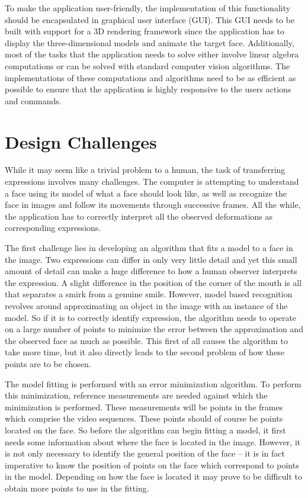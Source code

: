 \documentclass[11pt,a4paper,twoside]{report}
\begin{document}
To make the application user-friendly, the implementation of this functionality should be encapsulated in
graphical user interface (GUI). This GUI needs to be built with support for a 3D
rendering framework since the application has to display the three-dimensional models and animate
the target face. Additionally, most of the tasks that the application needs to
solve either involve linear algebra computations or can be solved with standard
computer vision algorithms. The implementations of these computations and
algorithms need to be as efficient as possible to ensure that the application is
highly responsive to the users actions and commands.

\section{Design Challenges}
While it may seem like a trivial problem to a human, the task of transferring expressions involves many
challenges. The computer is attempting to understand a face using its model of
what a face should look like, as well as recognize the face in images and follow
its movements through successive frames. All the while, the application has to 
correctly interpret all the observed deformations as corresponding expressions.  

The first challenge lies in developing an algorithm that fits a model to a face in
the image. Two expressions can differ in only very little detail and yet this
small amount of detail can make a huge difference to how a human observer
interprets the expression. A slight difference in the position of the corner of
the mouth is all that separates a smirk from a genuine smile. However, model based
recognition revolves around approximating an object in the image with an
instance of the model. So if it is to correctly identify expression, the
algorithm needs to operate on a large
number of points to minimize the error between the approximation and the
observed face as much as possible. This first of all causes the algorithm to take
more time, but it also directly leads to the second problem of how these points
are to be chosen. 

The model fitting is performed with an error minimization algorithm. To perform
this minimization, reference measurements are needed against which the minimization is
performed. These measurements will be points in the frames which comprise the
video sequences. These points should of course be points located on the
face. So before the algorithm can begin fitting a model, it first needs some
information about where the face is located in the image. However, it is not
only necessary to identify the general position of the face -- it is in fact
imperative to know the position of points on the face which correspond to points in the
model. Depending on how the face is located it may prove to be difficult to
obtain more points to use in the fitting.
\end{document}
